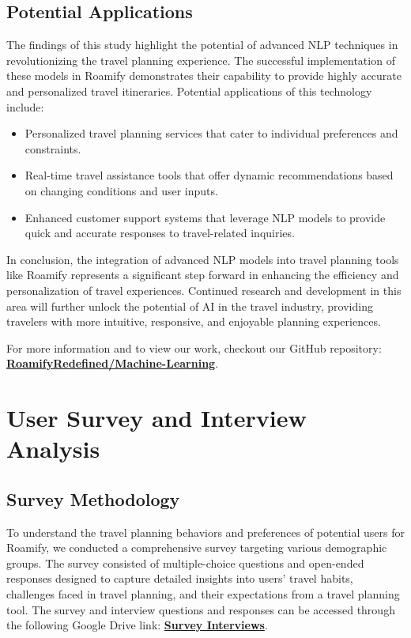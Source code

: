 \documentclass[conference]{IEEEtran}
\begin{document}
    \subsection{Potential Applications}

        The findings of this study highlight the potential of advanced NLP techniques in revolutionizing the travel planning experience. The successful implementation of these models in Roamify demonstrates their capability to provide highly accurate and personalized travel itineraries. Potential applications of this technology include:
        \begin{itemize}
            \item Personalized travel planning services that cater to individual preferences and constraints.
            \item Real-time travel assistance tools that offer dynamic recommendations based on changing conditions and user inputs.
            \item Enhanced customer support systems that leverage NLP models to provide quick and accurate responses to travel-related inquiries.
        \end{itemize}

        In conclusion, the integration of advanced NLP models into travel planning tools like Roamify represents a significant step forward in enhancing the efficiency and personalization of travel experiences. Continued research and development in this area will further unlock the potential of AI in the travel industry, providing travelers with more intuitive, responsive, and enjoyable planning experiences.

        For more information and to view our work, checkout our GitHub repository: \href{https://github.com/RoamifyRedefined/Machine-Learning}{\textbf{RoamifyRedefined/Machine-Learning}}.

\section{User Survey and Interview Analysis}

    \subsection{Survey Methodology}
        To understand the travel planning behaviors and preferences of potential users for Roamify, we conducted a comprehensive survey targeting various demographic groups. The survey consisted of multiple-choice questions and open-ended responses designed to capture detailed insights into users' travel habits, challenges faced in travel planning, and their expectations from a travel planning tool. The survey and interview questions and responses can be accessed through the following Google Drive link: \href{https://drive.google.com/drive/folders/1mKPTXZ7n7ZFmMEK6QBOKU0op3mf8hCta?usp=sharing}{\textbf{Survey Interviews}}.
\end{document}
